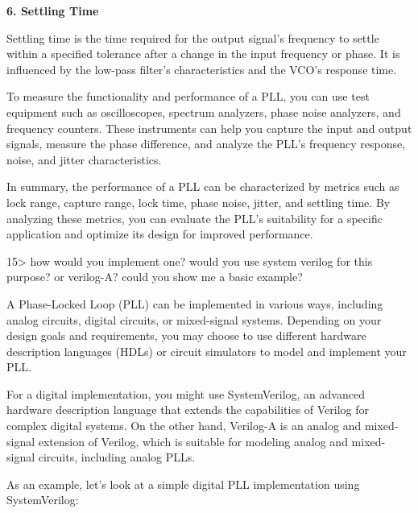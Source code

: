 \documentclass[
]{article}
\begin{document}
\textbf{6. Settling Time}

Settling time is the time required for the output signal's frequency to
settle within a specified tolerance after a change in the input
frequency or phase. It is influenced by the low-pass filter's
characteristics and the VCO's response time.

To measure the functionality and performance of a PLL, you can use test
equipment such as oscilloscopes, spectrum analyzers, phase noise
analyzers, and frequency counters. These instruments can help you
capture the input and output signals, measure the phase difference, and
analyze the PLL's frequency response, noise, and jitter characteristics.

In summary, the performance of a PLL can be characterized by metrics
such as lock range, capture range, lock time, phase noise, jitter, and
settling time. By analyzing these metrics, you can evaluate the PLL's
suitability for a specific application and optimize its design for
improved performance.

15\textgreater{} how would you implement one? would you use system
verilog for this purpose? or verilog-A? could you show me a basic
example?

A Phase-Locked Loop (PLL) can be implemented in various ways, including
analog circuits, digital circuits, or mixed-signal systems. Depending on
your design goals and requirements, you may choose to use different
hardware description languages (HDLs) or circuit simulators to model and
implement your PLL.

For a digital implementation, you might use SystemVerilog, an advanced
hardware description language that extends the capabilities of Verilog
for complex digital systems. On the other hand, Verilog-A is an analog
and mixed-signal extension of Verilog, which is suitable for modeling
analog and mixed-signal circuits, including analog PLLs.

As an example, let's look at a simple digital PLL implementation using
SystemVerilog:
\end{document}
